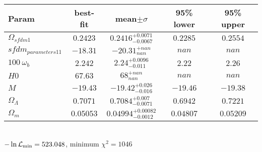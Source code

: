 \begin{tabular}{|l|c|c|c|c|} 
 \hline 
Param & best-fit & mean$\pm\sigma$ & 95\% lower & 95\% upper \\ \hline 
$\Omega_{sfdm 1 }$ &$0.2423$ & $0.2416_{-0.0067}^{+0.0071}$ & $0.2285$ & $0.2554$ \\ 
$sfdm_{parameters 1  1 }$ &$-18.31$ & $-20.31_{nan}^{+nan}$ & $nan$ & $nan$ \\ 
$100~\omega_{b }$ &$2.242$ & $2.24_{-0.011}^{+0.0096}$ & $2.22$ & $2.26$ \\ 
$H0$ &$67.63$ & $68_{nan}^{+nan}$ & $nan$ & $nan$ \\ 
$M$ &$-19.43$ & $-19.42_{-0.016}^{+0.026}$ & $-19.46$ & $-19.38$ \\ 
$\Omega_{\Lambda }$ &$0.7071$ & $0.7084_{-0.0071}^{+0.007}$ & $0.6942$ & $0.7221$ \\ 
$\Omega_{m }$ &$0.05053$ & $0.04994_{-0.0012}^{+0.00082}$ & $0.04807$ & $0.05209$ \\ 
\hline 
 \end{tabular} \\ 
$-\ln{\cal L}_\mathrm{min} =523.048$, minimum $\chi^2=1046$ \\ 
